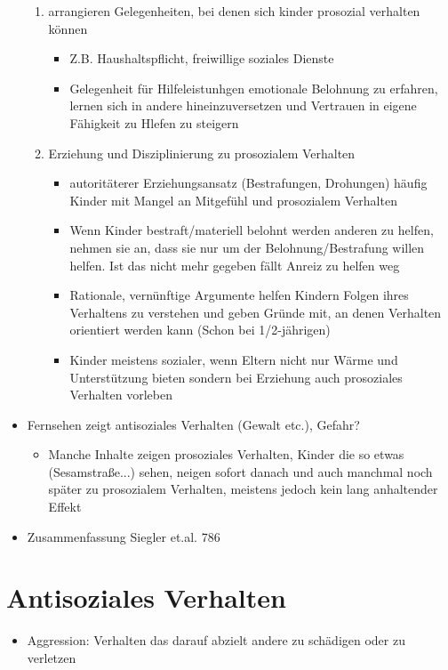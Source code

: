 \begin{itemize}
\begin{enumerate}
			\item
				arrangieren Gelegenheiten, bei denen sich kinder prosozial verhalten können
				\begin{itemize}
					\item
						Z.B. Haushaltspflicht, freiwillige soziales Dienste 
					\item
						Gelegenheit für Hilfeleistunhgen emotionale Belohnung zu erfahren, lernen sich in andere hineinzuversetzen und Vertrauen in eigene Fähigkeit zu Hlefen zu steigern
				\end{itemize}
			\item
				Erziehung und Disziplinierung zu prosozialem Verhalten
				\begin{itemize}
					\item
						autoritäterer Erziehungsansatz (Bestrafungen, Drohungen) häufig Kinder mit Mangel an Mitgefühl und prosozialem Verhalten
					\item
						Wenn Kinder bestraft/materiell belohnt werden anderen zu helfen, nehmen sie an, dass sie nur um der Belohnung/Bestrafung willen helfen. Ist das nicht mehr gegeben fällt Anreiz zu helfen weg
					\item
						Rationale, vernünftige Argumente helfen Kindern Folgen ihres Verhaltens zu verstehen und geben Gründe mit, an denen Verhalten orientiert werden kann (Schon bei 1/2-jährigen)
					\item
						Kinder meistens sozialer, wenn Eltern nicht nur Wärme und Unterstützung bieten sondern bei Erziehung auch prosoziales Verhalten vorleben
				\end{itemize}
	\end{enumerate}
\item
	Fernsehen zeigt antisoziales Verhalten (Gewalt etc.), Gefahr?
	\begin{itemize}
		\item
			Manche Inhalte zeigen prosoziales Verhalten, Kinder die so etwas (Sesamstraße...) sehen, neigen sofort danach und auch manchmal noch später zu prosozialem Verhalten, meistens jedoch kein lang anhaltender Effekt
	\end{itemize}
\item
	Zusammenfassung Siegler et.al. 786
\end{itemize}

\section{Antisoziales Verhalten}
\begin{itemize}
	\item
		Aggression: Verhalten das darauf abzielt andere zu schädigen oder zu verletzen
\end{itemize}
